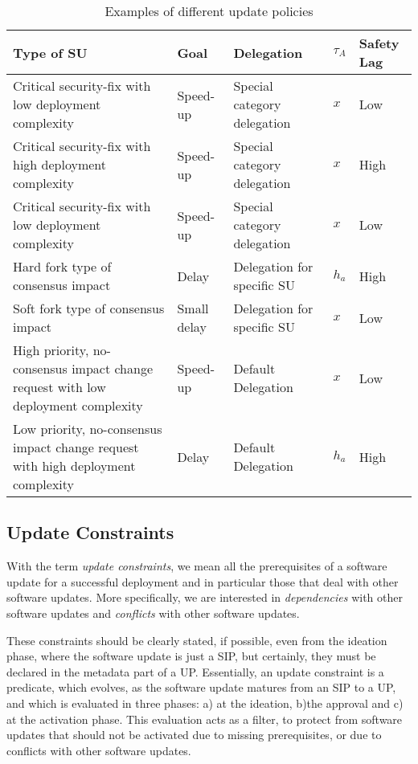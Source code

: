 \begin{table}[h!]
\centering
\begin{tabu} to 1.0\textwidth {||X[3.5l] | X[l] | X[2l] | X[0.5l] | X[l] ||}
\hline
\textbf{Type of SU} & \textbf{Goal} & \textbf{Delegation} & $\tau_A$ & \textbf{Safety Lag} \\
\hline
Critical security-fix with low deployment complexity & Speed-up & Special category delegation & $x$ & Low \\
\hline
Critical security-fix with high deployment complexity & Speed-up & Special category delegation & $x$ & High \\
\hline
Critical security-fix with low deployment complexity & Speed-up & Special category delegation & $x$ & Low \\
\hline
Hard fork type of consensus impact & Delay & Delegation for specific SU  & $h_a$ & High \\
\hline
Soft fork type of consensus impact & Small delay & Delegation for specific SU  & $x$ & Low \\
\hline
High priority, no-consensus impact change request with low deployment complexity & Speed-up & Default Delegation & $x$ & Low \\
\hline
Low priority, no-consensus impact change request with high deployment complexity & Delay & Default Delegation & $h_a$ & High \\
\hline
\end{tabu}
\caption{Examples of different update policies}
\label{update-policies-table}
\end{table}

\subsection{Update Constraints}
With the term \emph{update constraints}, we mean all the prerequisites of a software update for a successful deployment and in particular those that deal with other software updates. 
More specifically, we are interested in \emph{dependencies} with other software updates and \emph{conflicts} with other software updates. 

These constraints should be clearly stated, if possible, even from the ideation phase, where the software update is just a SIP, but certainly, they must be declared in the metadata part of a UP. Essentially, an update  constraint is a predicate, which evolves, as the software update matures from an SIP to a UP,  and which is evaluated in three phases: a) at the ideation, b)the approval and c) at the activation phase. This evaluation acts as a filter, to protect from software updates that should not be activated due to missing prerequisites, or due to conflicts with other software updates.

